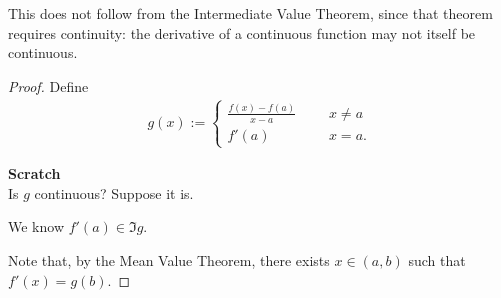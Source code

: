 \documentclass[12pt]{article}
\begin{document}
\begin{remark*}
  This does not follow from the Intermediate Value Theorem, since that theorem requires continuity:
  the derivative of a continuous function may not itself be continuous.
\end{remark*}

\begin{proof}
  Define
  \begin{align*}
    g(x) :=
    \begin{cases}
      \frac{f(x) - f(a)}{x - a} ~~~~~~~ &x \neq a\\
      f'(a) ~~~~~~~ &x = a.
    \end{cases}
  \end{align*}

  {\bf Scratch}\\
  Is $g$ continuous? Suppose it is.

  We know $f'(a) \in \Im g$.



  Note that, by the Mean Value Theorem, there exists $x \in (a, b)$ such that $f'(x) = g(b)$.


\end{proof}
\end{document}
